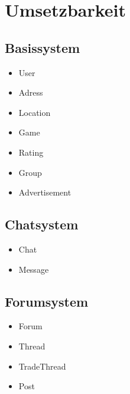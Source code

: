 \documentclass[DIV=13, 10pt,a4paper]{scrartcl} %
\begin{document}
\section{Umsetzbarkeit}
\begin{multicols}{2}
	\subsection*{Basissystem}
		\begin{itemize}
			\item User
			\item Adress
			\item Location
			\item Game
			\item Rating
			\item Group
			\item Advertisement
		\end{itemize}
	\subsection*{Chatsystem}
		\begin{itemize}
			\item Chat
			\item Message
		\end{itemize}
	\subsection*{Forumsystem}
		\begin{itemize}
			\item Forum
			\item Thread
			\item TradeThread
			\item Post
		\end{itemize}
\end{multicols}
\end{document}
